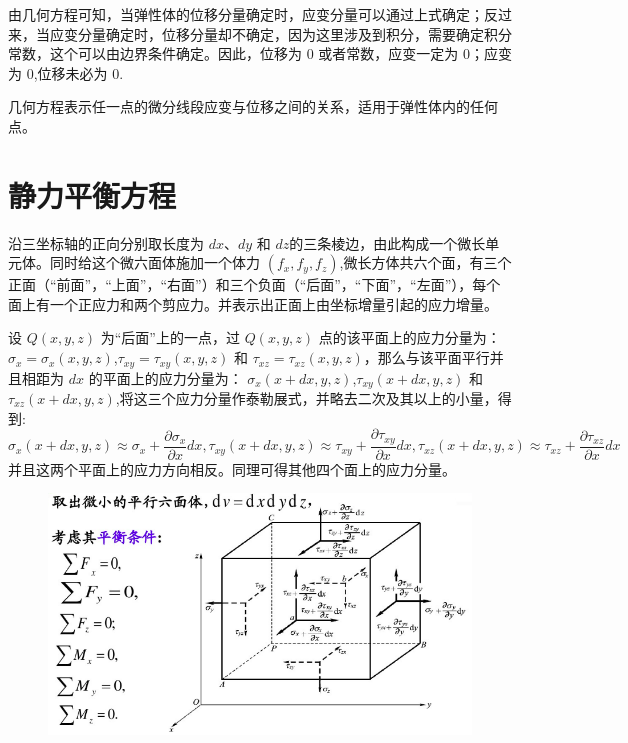 \documentclass[12pt,a4paper]{article}
\begin{document}
由几何方程可知，当弹性体的位移分量确定时，应变分量可以通过上式确定；反过来，当应变分量确定时，位移分量却不确定，因为这里涉及到积分，需要确定积分常数，这个可以由边界条件确定。因此，位移为 $0$ 或者常数，应变一定为 $0$；应变为 $0$,位移未必为 $0$.

几何方程表示任一点的微分线段应变与位移之间的关系，适用于弹性体内的任何点。

\section{静力平衡方程}
沿三坐标轴的正向分别取长度为 $dx$、$dy$ 和 $dz$的三条棱边，由此构成一个微长单元体。同时给这个微六面体施加一个体力 $(f_x,f_y,f_z)$,微长方体共六个面，有三个正面（“前面”，“上面”，“右面”）和三个负面（“后面”，“下面”，“左面”），每个面上有一个正应力和两个剪应力。并表示出正面上由坐标增量引起的应力增量。

设 $Q(x,y,z)$ 为“后面”上的一点，过 $Q(x,y,z)$ 点的该平面上的应力分量为： $\sigma_x=\sigma_x(x,y,z)$,$\tau_{xy}=\tau_{xy}(x,y,z)$ 和 $\tau_{xz}=\tau_{xz}(x,y,z)$，那么与该平面平行并且相距为 $dx$ 的平面上的应力分量为： $\sigma_x(x+dx,y,z)$,$\tau_{xy}(x+dx,y,z)$ 和 $\tau_{xz}(x+dx,y,z)$,将这三个应力分量作泰勒展式，并略去二次及其以上的小量，得到:
$$
\sigma_x(x+dx,y,z)\approx \sigma_x+\frac{\partial\sigma_x}{\partial x}dx,\tau_{xy}(x+dx,y,z)\approx \tau_{xy}+\frac{\partial\tau_{xy}}{\partial x}dx,\tau_{xz}(x+dx,y,z)\approx \tau_{xz}+\frac{\partial\tau_{xz}}{\partial x}dx
$$
并且这两个平面上的应力方向相反。同理可得其他四个面上的应力分量。

\begin{figure}[H]
\centering
\includegraphics[scale=0.5]{./figures/15.png}
\caption{}
\end{figure}
\end{document}
